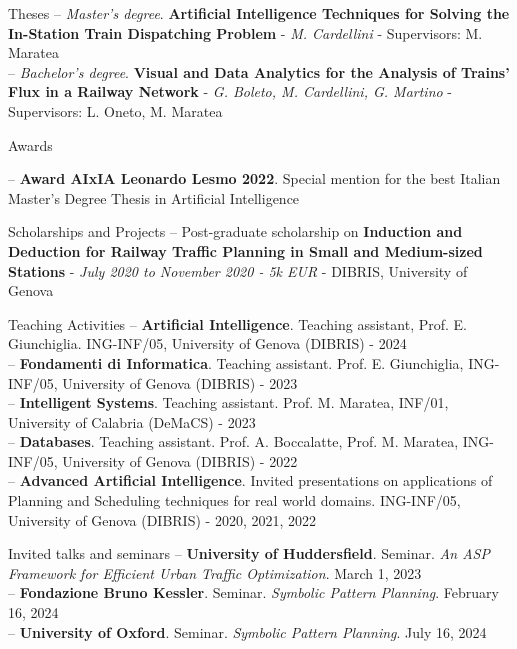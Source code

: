 \documentclass{resume} %
\begin{document}
\begin{rSection}{Theses}
-- \textit{Master's degree}. \textbf{Artificial Intelligence Techniques for Solving the In-Station
Train Dispatching Problem} - \textit{M. Cardellini} - Supervisors: M. Maratea\\
-- \textit{Bachelor's degree}. \textbf{Visual and Data Analytics for the Analysis of Trains' Flux in a Railway Network} - \textit{G. Boleto, M. Cardellini, G. Martino} - Supervisors: L. Oneto, M. Maratea
\end{rSection}
\begin{rSection}{Awards}

-- \textbf{Award AIxIA Leonardo Lesmo 2022}. Special mention for the best Italian Master's Degree Thesis in Artificial Intelligence
\end{rSection}

\begin{rSection}{Scholarships and Projects}
-- Post-graduate scholarship on \textbf{Induction and Deduction for Railway Traffic Planning in Small and Medium-sized Stations} - \textit{July 2020 to November 2020 - 5k EUR} - DIBRIS, University of Genova
\end{rSection}

\begin{rSection}{Teaching Activities}
-- \textbf{Artificial Intelligence}. Teaching assistant, Prof. E. Giunchiglia. ING-INF/05, University of Genova (DIBRIS) - 2024\\
-- \textbf{Fondamenti di Informatica}. Teaching assistant. Prof. E. Giunchiglia, ING-INF/05, University of Genova (DIBRIS) - 2023\\
-- \textbf{Intelligent Systems}. Teaching assistant. Prof. M. Maratea, INF/01, University of Calabria (DeMaCS) - 2023\\
-- \textbf{Databases}. Teaching assistant. Prof. A. Boccalatte, Prof. M. Maratea, ING-INF/05, University of Genova (DIBRIS) - 2022\\
-- \textbf{Advanced Artificial Intelligence}. Invited presentations on applications of Planning and Scheduling techniques for real world domains. ING-INF/05, University of Genova (DIBRIS) - 2020, 2021, 2022
\end{rSection}

\begin{rSection}{Invited talks and seminars}
-- \textbf{University of Huddersfield}. Seminar. \textit{An ASP Framework for Efficient Urban Traffic Optimization}. March 1, 2023\\
-- \textbf{Fondazione Bruno Kessler}. Seminar. \textit{Symbolic Pattern Planning}. February 16, 2024\\
-- \textbf{University of Oxford}. Seminar. \textit{Symbolic Pattern Planning}. July 16, 2024
\end{rSection}
\end{document}
